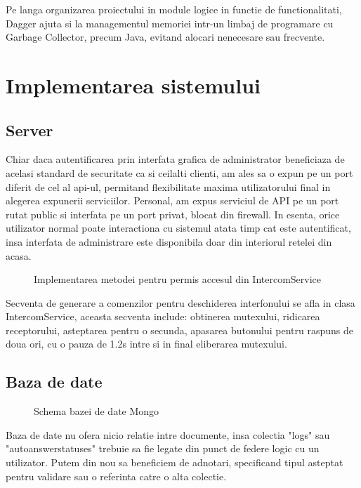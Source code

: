 Pe langa organizarea proiectului in module logice in functie de functionalitati, Dagger ajuta si la managementul memoriei intr-un limbaj de programare cu Garbage Collector, precum Java, evitand alocari nenecesare sau frecvente.


\section {Implementarea sistemului}

\subsection {Server}

Chiar daca autentificarea prin interfata grafica de administrator beneficiaza de acelasi standard de securitate ca si ceilalti clienti, am ales sa o expun pe un port diferit de cel al \acrshort{api}-ul, permitand flexibilitate maxima utilizatorului final in alegerea expunerii serviciilor. Personal, am expus serviciul de API pe un port rutat public si interfata pe un port privat, blocat din firewall. In esenta, orice utilizator normal poate interactiona cu sistemul atata timp cat este autentificat, insa interfata de administrare este disponibila doar din interiorul retelei din acasa.

\begin{figure}[h!]
  \centering
  \caption{Implementarea metodei pentru permis accesul din IntercomService}
\end{figure}

Secventa de generare a comenzilor pentru deschiderea interfonului se afla in clasa IntercomService, aceasta secventa include: obtinerea mutexului, ridicarea receptorului, asteptarea pentru o secunda, apasarea butonului pentru raspuns de doua ori, cu o pauza de 1.2s intre si in final eliberarea mutexului.

\subsection {Baza de date}

\begin{figure}[h!]
  \centering
  \caption{Schema bazei de date Mongo}
\end{figure}

Baza de date nu ofera nicio relatie intre documente, insa colectia "logs" sau "autoanswerstatuses" trebuie sa fie legate din punct de federe logic cu un utilizator. Putem din nou sa beneficiem de adnotari, specificand tipul asteptat pentru validare sau o referinta catre o alta colectie.

